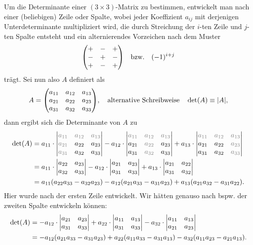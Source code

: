 Um die Determinante einer $(3\times 3)$-Matrix zu bestimmen, entwickelt man nach einer (beliebigen) Zeile oder Spalte, wobei jeder Koeffizient $a_{ij}$ mit derjenigen Unterdeterminante multipliziert wird, die durch Streichung der $i$-ten Zeile und $j$-ten Spalte entsteht und ein alternierendes Vorzeichen nach dem Muster 
\begin{align}
    \mqty(+ & - & + \\ - & + & - \\ + & - & +) \qq{bzw.} (-1)^{i+j}
\end{align}
trägt. Sei nun also $A$ definiert als 
\begin{align}
    A = \mqty(a_{11} & a_{12} & a_{13}\\ a_{21} & a_{22} & a_{23} \\ a_{31} & a_{32} & a_{33}), \qq{alternative Schreibweise} \det(A) \equiv |A|,
\end{align}
dann ergibt sich die Determinante von $A$ zu 
\begin{align}
    \det(A) &= a_{11} \cdot \mqty|\textcolor{gray}{a_{11}} & \textcolor{gray}{a_{12}} & \textcolor{gray}{a_{13}}\\ \textcolor{gray}{a_{21}} & a_{22} & a_{23} \\ \textcolor{gray}{a_{31}} & a_{32} & a_{33}| - a_{12} \cdot \mqty|\textcolor{gray}{a_{11}} & \textcolor{gray}{a_{12}} & \textcolor{gray}{a_{13}}\\ a_{21} & \textcolor{gray}{a_{22}} & a_{23} \\ a_{31} & \textcolor{gray}{a_{32}} & a_{33}| + a_{13} \cdot \mqty|\textcolor{gray}{a_{11}} & \textcolor{gray}{a_{12}} & \textcolor{gray}{a_{13}}\\ a_{21} & a_{22} & \textcolor{gray}{a_{23}} \\ a_{31} & a_{32} & \textcolor{gray}{a_{33}}| \notag \\
    &= a_{11} \cdot \mqty|a_{22} & a_{23} \\ a_{32} & a_{33}| - a_{12} \cdot \mqty|a_{21} & a_{23} \\ a_{31} & a_{33}| + a_{13} \cdot \mqty|a_{21} & a_{22} \\ a_{31} & a_{32}| \notag \\
    &= a_{11} (a_{22}a_{33}-a_{32}a_{23}) - a_{12}(a_{21}a_{33}-a_{31}a_{23}) + a_{13} (a_{21}a_{32}-a_{31}a_{22}).
\end{align}
Hier wurde nach der ersten Zeile entwickelt. Wir hätten genauso nach bspw. der zweiten Spalte entwickeln können:
\begin{align}
    \det(A) &= -a_{12} \cdot \mqty|a_{21} & a_{23} \\ a_{31} & a_{33}| + a_{22} \cdot \mqty|a_{11} & a_{13} \\ a_{31} & a_{33}| - a_{32} \cdot \mqty|a_{11} & a_{13} \\ a_{21} & a_{23}| \notag \\
    &= -a_{12} (a_{21}a_{33}-a_{31}a_{23}) + a_{22}(a_{11}a_{33}-a_{31}a_{13}) - a_{32} (a_{11}a_{23}-a_{21}a_{13}).
\end{align}

